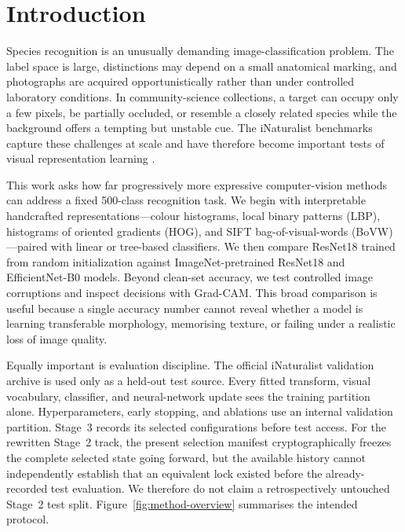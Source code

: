 \section{Introduction}
\label{sec:introduction}

Species recognition is an unusually demanding image-classification problem.
The label space is large, distinctions may depend on a small anatomical
marking, and photographs are acquired opportunistically rather than under
controlled laboratory conditions.  In community-science collections, a
target can occupy only a few pixels, be partially occluded, or resemble a
closely related species while the background offers a tempting but unstable
cue.  The iNaturalist benchmarks capture these challenges at scale and have
therefore become important tests of visual representation learning
\cite{vanhorn2018inaturalist,vanhorn2021benchmarking}.

This work asks how far progressively more expressive computer-vision methods
can address a fixed 500-class recognition task.  We begin with interpretable
handcrafted representations---colour histograms, local binary patterns (LBP),
histograms of oriented gradients (HOG), and SIFT bag-of-visual-words
(BoVW)---paired with linear or tree-based classifiers.  We then compare
ResNet18 trained from random initialization against ImageNet-pretrained
ResNet18 and EfficientNet-B0 models.  Beyond clean-set accuracy, we test
controlled image corruptions and inspect decisions with Grad-CAM.  This broad
comparison is useful because a single accuracy number cannot reveal whether a
model is learning transferable morphology, memorising texture, or failing
under a realistic loss of image quality.

Equally important is evaluation discipline.  The official iNaturalist
validation archive is used only as a held-out test source.  Every fitted
transform, visual vocabulary, classifier, and neural-network update sees the
training partition alone.  Hyperparameters, early stopping, and ablations use
an internal validation partition.  Stage~3 records its selected configurations
before test access.  For the rewritten Stage~2 track, the present selection
manifest cryptographically freezes the complete selected state going forward,
but the available history cannot independently establish that an equivalent
lock existed before the already-recorded test evaluation.  We therefore do not
claim a retrospectively untouched Stage~2 test split.
Figure~\ref{fig:method-overview} summarises the intended protocol.

